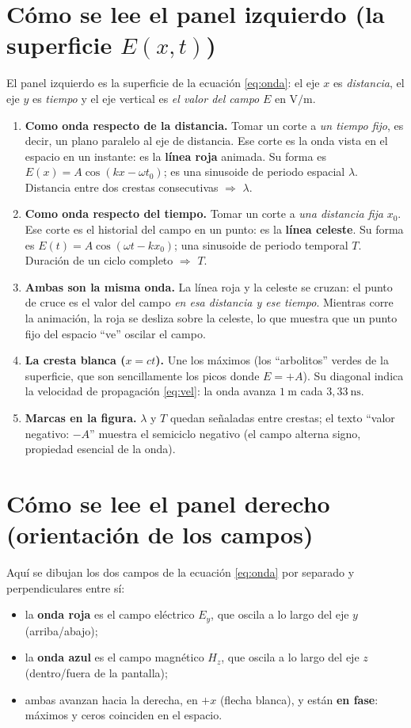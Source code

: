 \documentclass[11pt,a4paper]{article}
\begin{document}
\section{Cómo se lee el panel izquierdo (la superficie $E(x,t)$)}
El panel izquierdo es la superficie de la ecuación \eqref{eq:onda}: el eje
$x$ es \emph{distancia}, el eje $y$ es \emph{tiempo} y el eje vertical es
\emph{el valor del campo} $E$ en $\si{\volt\per\metre}$.

\begin{enumerate}[leftmargin=*, itemsep=2pt]
  \item \textbf{Como onda respecto de la distancia.} Tomar un corte a \emph{un
  tiempo fijo}, es decir, un plano paralelo al eje de distancia. Ese corte es la
  onda vista en el espacio en un instante: es la \textbf{línea roja} animada. Su
  forma es $E(x) = A\cos(kx - \omega t_0)$; es una sinusoide de periodo espacial
  $\lambda$. Distancia entre dos crestas consecutivas $\Rightarrow$ $\lambda$.
  \item \textbf{Como onda respecto del tiempo.} Tomar un corte a \emph{una
  distancia fija} $x_0$. Ese corte es el historial del campo en un punto: es la
  \textbf{línea celeste}. Su forma es $E(t) = A\cos(\omega t - kx_0)$; una
  sinusoide de periodo temporal $T$. Duración de un ciclo completo $\Rightarrow$
  $T$.
  \item \textbf{Ambas son la misma onda.} La línea roja y la celeste se cruzan:
  el punto de cruce es el valor del campo \emph{en esa distancia y ese tiempo}.
  Mientras corre la animación, la roja se desliza sobre la celeste, lo que
  muestra que un punto fijo del espacio “ve” oscilar el campo.
  \item \textbf{La cresta blanca ($x = ct$).} Une los máximos (los “arbolitos”
  verdes de la superficie, que son sencillamente los picos donde $E = +A$). Su
  diagonal indica la velocidad de propagación \eqref{eq:vel}: la onda avanza
  $1\ \si{\metre}$ cada $3{,}33\ \si{\nano\second}$.
  \item \textbf{Marcas en la figura.} $\lambda$ y $T$ quedan señaladas entre
  crestas; el texto ``valor negativo: $-A$'' muestra el semiciclo negativo (el
  campo alterna signo, propiedad esencial de la onda).
\end{enumerate}

\section{Cómo se lee el panel derecho (orientación de los campos)}
Aquí se dibujan los dos campos de la ecuación \eqref{eq:onda} por separado y
perpendiculares entre sí:
\begin{itemize}[leftmargin=*, itemsep=2pt]
  \item la \textbf{onda roja} es el campo eléctrico $E_y$, que oscila a lo
  largo del eje $y$ (arriba/abajo);
  \item la \textbf{onda azul} es el campo magnético $H_z$, que oscila a lo
  largo del eje $z$ (dentro/fuera de la pantalla);
  \item ambas avanzan hacia la derecha, en $+x$ (flecha blanca), y están
  \textbf{en fase}: máximos y ceros coinciden en el espacio.
\end{itemize}
\end{document}
